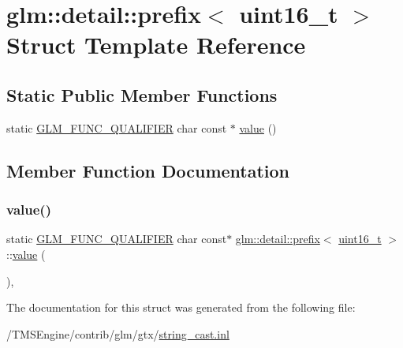 \hypertarget{structglm_1_1detail_1_1prefix_3_01uint16__t_01_4}{}\section{glm\+:\+:detail\+:\+:prefix$<$ uint16\+\_\+t $>$ Struct Template Reference}
\label{structglm_1_1detail_1_1prefix_3_01uint16__t_01_4}
\subsection*{Static Public Member Functions}
\begin{DoxyCompactItemize}
\item 
static \hyperlink{setup_8hpp_a33fdea6f91c5f834105f7415e2a64407}{G\+L\+M\+\_\+\+F\+U\+N\+C\+\_\+\+Q\+U\+A\+L\+I\+F\+I\+ER} char const  $\ast$ \hyperlink{structglm_1_1detail_1_1prefix_3_01uint16__t_01_4_a9546e8aaf707c3f0028c8da94f6c06da}{value} ()
\end{DoxyCompactItemize}


\subsection{Member Function Documentation}
\mbox{\label{structglm_1_1detail_1_1prefix_3_01uint16__t_01_4_a9546e8aaf707c3f0028c8da94f6c06da}} 
\subsubsection{\texorpdfstring{value()}{value()}}
{\footnotesize\ttfamily static \hyperlink{setup_8hpp_a33fdea6f91c5f834105f7415e2a64407}{G\+L\+M\+\_\+\+F\+U\+N\+C\+\_\+\+Q\+U\+A\+L\+I\+F\+I\+ER} char const$\ast$ \hyperlink{structglm_1_1detail_1_1prefix}{glm\+::detail\+::prefix}$<$ \hyperlink{group__gtc__type__precision_gac4eb4f43cae8129b00086dc234d3b8fc}{uint16\+\_\+t} $>$\+::\hyperlink{_s_d_l__opengl__glext_8h_a8ad81492d410ff2ac11f754f4042150f}{value} (\begin{DoxyParamCaption}{ }\end{DoxyParamCaption})\hspace{0.3cm}{\ttfamily [inline]}, {\ttfamily [static]}}



The documentation for this struct was generated from the following file\+:\begin{DoxyCompactItemize}
\item 
/\+T\+M\+S\+Engine/contrib/glm/gtx/\hyperlink{string__cast_8inl}{string\+\_\+cast.\+inl}\end{DoxyCompactItemize}
